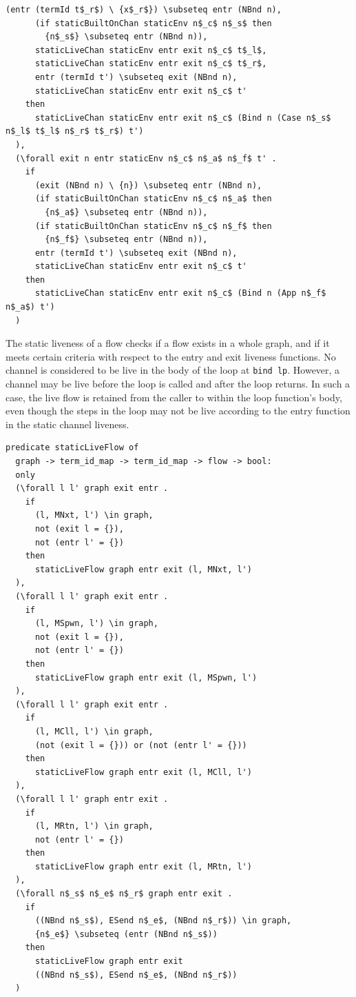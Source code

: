 \documentclass[10pt]{article}
\begin{document}
\begin{lstlisting}[language=logic, mathescape]
      (entr (termId t$_r$) \ {x$_r$}) \subseteq entr (NBnd n),
      (if staticBuiltOnChan staticEnv n$_c$ n$_s$ then
        {n$_s$} \subseteq entr (NBnd n)),
      staticLiveChan staticEnv entr exit n$_c$ t$_l$,
      staticLiveChan staticEnv entr exit n$_c$ t$_r$,
      entr (termId t') \subseteq exit (NBnd n),
      staticLiveChan staticEnv entr exit n$_c$ t'
    then 
      staticLiveChan staticEnv entr exit n$_c$ (Bind n (Case n$_s$ n$_l$ t$_l$ n$_r$ t$_r$) t')
  ),
  (\forall exit n entr staticEnv n$_c$ n$_a$ n$_f$ t' .
    if
      (exit (NBnd n) \ {n}) \subseteq entr (NBnd n),
      (if staticBuiltOnChan staticEnv n$_c$ n$_a$ then
        {n$_a$} \subseteq entr (NBnd n)),
      (if staticBuiltOnChan staticEnv n$_c$ n$_f$ then
        {n$_f$} \subseteq entr (NBnd n)),
      entr (termId t') \subseteq exit (NBnd n),
      staticLiveChan staticEnv entr exit n$_c$ t'
    then
      staticLiveChan staticEnv entr exit n$_c$ (Bind n (App n$_f$ n$_a$) t')
  )
\end{lstlisting}

The static liveness of a flow checks if a flow exists in a whole graph,
and if it meets certain criteria with respect to the entry and exit liveness
functions. 
No channel is considered to be live in the body of the loop at \lstinline[language=normal_lang]{bind lp}.
However, a channel may be live before the loop is
called and after the loop returns. In such a case, the live flow is retained
from the caller to within the loop function's body, even though the steps in
the loop may not be live according to the entry function in the static channel liveness.

\begin{lstlisting}[language=logic, mathescape]
  predicate staticLiveFlow of
  graph -> term_id_map -> term_id_map -> flow -> bool:
  only
  (\forall l l' graph exit entr . 
    if
      (l, MNxt, l') \in graph,
      not (exit l = {}),
      not (entr l' = {})
    then
      staticLiveFlow graph entr exit (l, MNxt, l')
  ),
  (\forall l l' graph exit entr .
    if
      (l, MSpwn, l') \in graph, 
      not (exit l = {}),
      not (entr l' = {})
    then
      staticLiveFlow graph entr exit (l, MSpwn, l')
  ),
  (\forall l l' graph exit entr .
    if
      (l, MCll, l') \in graph,
      (not (exit l = {})) or (not (entr l' = {}))
    then
      staticLiveFlow graph entr exit (l, MCll, l')
  ),
  (\forall l l' graph entr exit .
    if
      (l, MRtn, l') \in graph,
      not (entr l' = {})
    then
      staticLiveFlow graph entr exit (l, MRtn, l')
  ),
  (\forall n$_s$ n$_e$ n$_r$ graph entr exit .
    if
      ((NBnd n$_s$), ESend n$_e$, (NBnd n$_r$)) \in graph, 
      {n$_e$} \subseteq (entr (NBnd n$_s$))
    then
      staticLiveFlow graph entr exit
      ((NBnd n$_s$), ESend n$_e$, (NBnd n$_r$))
  )
\end{lstlisting}
\end{document}
